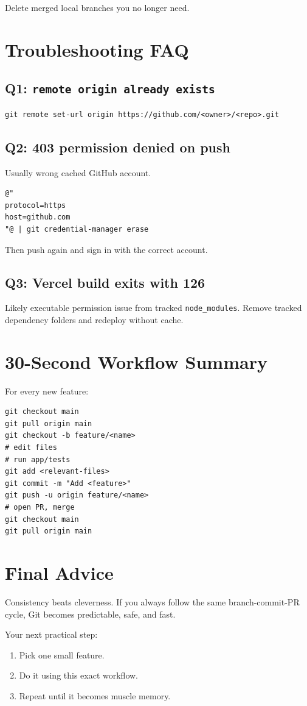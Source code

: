 \documentclass[11pt,a4paper]{article}
\begin{document}
Delete merged local branches you no longer need.

\section{Troubleshooting FAQ}
\subsection*{Q1: \texttt{remote origin already exists}}
\begin{Verbatim}[fontsize=\small]
git remote set-url origin https://github.com/<owner>/<repo>.git
\end{Verbatim}

\subsection*{Q2: 403 permission denied on push}
Usually wrong cached GitHub account.
\begin{Verbatim}[fontsize=\small]
@"
protocol=https
host=github.com
"@ | git credential-manager erase
\end{Verbatim}
Then push again and sign in with the correct account.

\subsection*{Q3: Vercel build exits with 126}
Likely executable permission issue from tracked \texttt{node\_modules}. Remove tracked dependency folders and redeploy without cache.

\section{30-Second Workflow Summary}
For every new feature:
\begin{Verbatim}[fontsize=\small]
git checkout main
git pull origin main
git checkout -b feature/<name>
# edit files
# run app/tests
git add <relevant-files>
git commit -m "Add <feature>"
git push -u origin feature/<name>
# open PR, merge
git checkout main
git pull origin main
\end{Verbatim}

\section{Final Advice}
Consistency beats cleverness. If you always follow the same branch-commit-PR cycle, Git becomes predictable, safe, and fast.

Your next practical step:
\begin{enumerate}[leftmargin=1.5em]
  \item Pick one small feature.
  \item Do it using this exact workflow.
  \item Repeat until it becomes muscle memory.
\end{enumerate}
\end{document}

